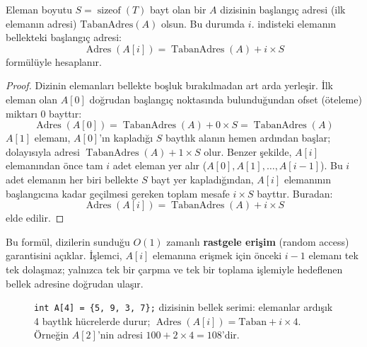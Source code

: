 \begin{theorem}
Eleman boyutu $S = \operatorname{sizeof}(T)$ bayt olan bir $A$ dizisinin başlangıç adresi (ilk elemanın adresi) $\text{TabanAdres}(A)$ olsun. Bu durumda $i$. indisteki elemanın bellekteki başlangıç adresi:
\[
\operatorname{Adres}(A[i]) = \operatorname{TabanAdres}(A) + i \times S
\]
formülüyle hesaplanır.
\end{theorem}

\begin{proof}
Dizinin elemanları bellekte boşluk bırakılmadan art arda yerleşir. İlk eleman olan $A[0]$ doğrudan başlangıç noktasında bulunduğundan ofset (öteleme) miktarı 0 bayttır:
\[
\operatorname{Adres}(A[0]) = \operatorname{TabanAdres}(A) + 0 \times S = \operatorname{TabanAdres}(A)
\]
$A[1]$ elemanı, $A[0]$'ın kapladığı $S$ baytlık alanın hemen ardından başlar; dolayısıyla adresi $\operatorname{TabanAdres}(A) + 1 \times S$ olur. Benzer şekilde, $A[i]$ elemanından önce tam $i$ adet eleman yer alır ($A[0], A[1], \dots, A[i-1]$). Bu $i$ adet elemanın her biri bellekte $S$ bayt yer kapladığından, $A[i]$ elemanının başlangıcına kadar geçilmesi gereken toplam mesafe $i \times S$ bayttır. Buradan:
\[
\operatorname{Adres}(A[i]) = \operatorname{TabanAdres}(A) + i \times S
\]
elde edilir.
\end{proof}

Bu formül, dizilerin sunduğu $O(1)$ zamanlı \textbf{rastgele erişim} (random access) garantisini açıklar. İşlemci, $A[i]$ elemanına erişmek için önceki $i-1$ elemanı tek tek dolaşmaz; yalnızca tek bir çarpma ve tek bir toplama işlemiyle hedeflenen bellek adresine doğrudan ulaşır.

\begin{figure}[ht]
\centering
{}
\caption{\texttt{int A[4] = \{5, 9, 3, 7\};} dizisinin bellek serimi: elemanlar
ardışık 4 baytlık hücrelerde durur;
$\operatorname{Adres}(A[i]) = \text{Taban} + i \times 4$. Örneğin $A[2]$'nin
adresi $100 + 2 \times 4 = 108$'dir.}
\end{figure}

